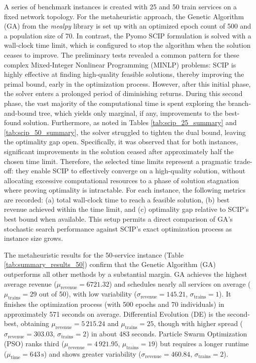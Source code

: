 \documentclass[Afour,sagev,times]{sagej}
\begin{document}
A series of benchmark instances is created with 25 and 50 train services on a fixed network topology. For the metaheuristic approach, the Genetic Algorithm (GA) from the \textit{mealpy} library is set up with an optimized epoch count of 500 and a population size of 70. In contrast, the Pyomo SCIP formulation is solved with a wall-clock time limit, which is configured to stop the algorithm when the solution ceases to improve. The preliminary tests revealed a common pattern for these complex Mixed-Integer Nonlinear Programming (MINLP) problems: SCIP is highly effective at finding high-quality feasible solutions, thereby improving the primal bound, early in the optimization process. However, after this initial phase, the solver enters a prolonged period of diminishing returns. During this second phase, the vast majority of the computational time is spent exploring the branch-and-bound tree, which yields only marginal, if any, improvements to the best-found solution. Furthermore, as noted in Tables \ref{tab:scip_25_summary} and \ref{tab:scip_50_summary}, the solver struggled to tighten the dual bound, leaving the optimality gap open. Specifically, it was observed that for both instances, significant improvements in the solution ceased after approximately half the chosen time limit. Therefore, the selected time limits represent a pragmatic trade-off: they enable SCIP to effectively converge on a high-quality solution, without allocating excessive computational resources to a phase of solution stagnation where proving optimality is intractable. For each instance, the following metrics are recorded: (a) total wall‐clock time to reach a feasible solution, (b) best revenue achieved within the time limit, and (c) optimality gap relative to SCIP’s best bound when available. This setup permits a direct comparison of GA’s stochastic search performance against SCIP’s exact optimization process as instance size grows.

The metaheuristic results for the 50‐service instance (Table \ref{tab:summary_results_50}) confirm that the Genetic Algorithm (GA) outperforms all other methods by a substantial margin. GA achieves the highest average revenue (\(\mu_{\text{revenue}} = 6721.32\)) and schedules nearly all services on average (\(\mu_{\text{trains}} = 29\) out of 50), with low variability (\(\sigma_{\text{revenue}} = 145.21\), \(\sigma_{\text{trains}} = 1\)). It finishes the optimization process (with 500 epochs and 70 individuals) in approximately 571 seconds on average. Differential Evolution (DE) is the second‐best, obtaining \(\mu_{\text{revenue}} = 5\,215.24\) and \(\mu_{\text{trains}} = 25\), though with higher spread (\(\sigma_{\text{revenue}} = 303.03\), \(\sigma_{\text{trains}} = 2\)) in about 483 seconds. Particle Swarm Optimization (PSO) ranks third (\(\mu_{\text{revenue}} = 4\,921.95\), \(\mu_{\text{trains}} = 19\)) but requires a longer runtime (\(\mu_{\text{time}} = 643\,\text{s}\)) and shows greater variability (\(\sigma_{\text{revenue}} = 460.84\), \(\sigma_{\text{trains}} = 2\)).
\end{document}
